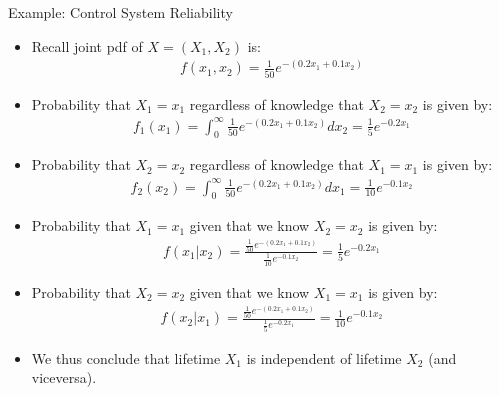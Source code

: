 \documentclass[9pt]{beamer}
\begin{document}
%
\begin{frame}{Example: Control System Reliability}

\begin{itemize}
\item Recall joint pdf of $X=(X_1,X_2)$ is:
\begin{align*}
f(x_1,x_2)=\frac{1}{50}e^{-(0.2x_1+0.1x_2)}
\end{align*} 
\item Probability that $X_1=x_1$ regardless of knowledge that $X_2=x_2$ is given by:
\begin{align*}
f_1(x_1)=\int_{0}^{\infty}\frac{1}{50}e^{-(0.2x_1+0.1x_2)}dx_2=\frac{1}{5}e^{-0.2x_1}
\end{align*} 
\item Probability that $X_2=x_2$ regardless of knowledge that $X_1=x_1$ is given by:
\begin{align*}
f_2(x_2)=\int_{0}^{\infty}\frac{1}{50}e^{-(0.2x_1+0.1x_2)}dx_1=\frac{1}{10}e^{-0.1x_2}
\end{align*} 
\item Probability that $X_1=x_1$ given that we know $X_2=x_2$ is given by:
\begin{align*}
f(x_1|x_2)=\frac{\frac{1}{50}e^{-(0.2x_1+0.1x_2)}}{\frac{1}{10}e^{-0.1x_2}}=\frac{1}{5}e^{-0.2x_1}
\end{align*}
\item Probability that $X_2=x_2$ given that we know $X_1=x_1$ is given by:
\begin{align*}
f(x_2|x_1)=\frac{\frac{1}{50}e^{-(0.2x_1+0.1x_2)}}{\frac{1}{5}e^{-0.2x_1}}=\frac{1}{10}e^{-0.1x_2}
\end{align*}
\item We thus conclude that lifetime $X_1$ is independent of lifetime $X_2$ (and viceversa). 
\end{itemize}

\end{frame}
\end{document}
